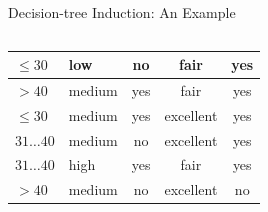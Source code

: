 \documentclass[aspectratio=169,t,table]{beamer}
\begin{document}
{\begin{frame}{Decision-tree Induction: An Example}
\begin{columns}
\begin{column}{0.6\textwidth}
\begin{tabular}{|l|l|c|c|c|}
            \cellcolor{yellow!20}$\leq 30$ & \cellcolor{yellow!20}low & \cellcolor{yellow!20}no & \cellcolor{yellow!20}fair & \cellcolor{green!20}yes \\\hline
            \cellcolor{yellow!20}$>40$ & \cellcolor{yellow!20}medium & \cellcolor{yellow!20}yes & \cellcolor{yellow!20}fair & \cellcolor{green!20}yes \\\hline
            \cellcolor{yellow!20}$\leq 30$ & \cellcolor{yellow!20}medium & \cellcolor{yellow!20}yes & \cellcolor{yellow!20}excellent & \cellcolor{green!20}yes \\\hline
            \cellcolor{yellow!20}$31\ldots40$ & \cellcolor{yellow!20}medium & \cellcolor{yellow!20}no & \cellcolor{yellow!20}excellent & \cellcolor{green!20}yes \\\hline
            \cellcolor{yellow!20}$31\ldots40$ & \cellcolor{yellow!20}high & \cellcolor{yellow!20}yes & \cellcolor{yellow!20}fair & \cellcolor{green!20}yes \\\hline
            \cellcolor{yellow!20}$>40$ & \cellcolor{yellow!20}medium & \cellcolor{yellow!20}no & \cellcolor{yellow!20}excellent & \cellcolor{red!20}no \\\hline
          \end{tabular}
        \end{column}
      \end{columns}
    \end{frame}
  }
\end{document}
